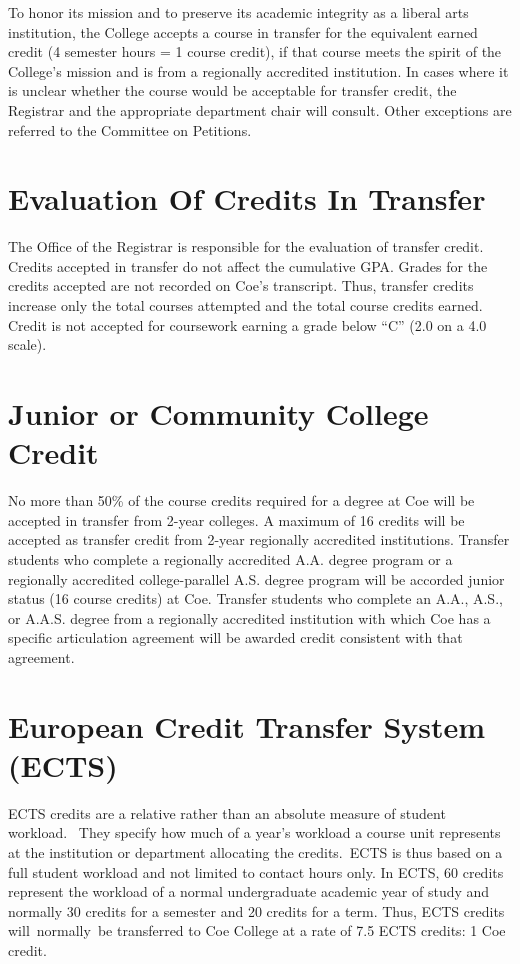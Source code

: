 \documentclass[
  letterpaper,
]{scrbook}
\begin{document}
To honor its mission and to preserve its academic integrity as a liberal
arts institution, the College accepts a course in transfer for the
equivalent earned credit (4 semester hours = 1 course credit), if that
course meets the spirit of the College's mission and is from a
regionally accredited institution. In cases where it is unclear whether
the course would be acceptable for transfer credit, the Registrar and
the appropriate department chair will consult. Other exceptions are
referred to the Committee on Petitions.

\section{Evaluation Of Credits In
Transfer}\label{evaluation-of-credits-in-transfer}

The Office of the Registrar is responsible for the evaluation of
transfer credit. Credits accepted in transfer do not affect the
cumulative GPA. Grades for the credits accepted are not recorded on
Coe's transcript. Thus, transfer credits increase only the total courses
attempted and the total course credits earned. Credit is not accepted
for coursework earning a grade below ``C'' (2.0 on a 4.0 scale).

\section{Junior or Community College
Credit}\label{junior-or-community-college-credit}

No more than 50\% of the course credits required for a degree at Coe
will be accepted in transfer from 2-year colleges. A maximum of 16
credits will be accepted as transfer credit from 2-year regionally
accredited institutions. Transfer students who complete a regionally
accredited A.A. degree program or a regionally accredited
college-parallel A.S. degree program will be accorded junior status (16
course credits) at Coe. Transfer students who complete an A.A., A.S., or
A.A.S. degree from a regionally accredited institution with which Coe
has a specific articulation agreement will be awarded credit consistent
with that agreement.

\section{European Credit Transfer System
(ECTS)}\label{european-credit-transfer-system-ects}

ECTS credits are a relative rather than an absolute measure of student
workload.~ They specify how much of a year's workload a course unit
represents at the institution or department allocating the credits.~ECTS
is thus based on a full student workload and not limited to contact
hours only. In ECTS, 60 credits represent the workload of a normal
undergraduate academic year of study and normally 30 credits for a
semester and 20 credits for a term. Thus, ECTS credits will~normally~be
transferred to Coe College at a rate of 7.5 ECTS credits: 1 Coe credit.
\end{document}
